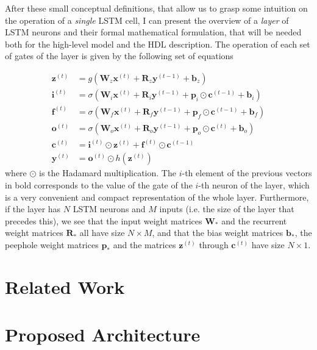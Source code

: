 \documentclass{IEEEtran}
\newcommand{\mb}[1]{\mathbf{#1}}
\begin{document}
After these small conceptual definitions, that allow us to grasp some intuition on the operation of a \textit{single} LSTM cell, I can present the overview of a \textit{layer} of LSTM neurons and their formal mathematical formulation, that will be needed both for the high-level model and the HDL description. The operation of each set of gates of the layer is given by the following set of equations

\begin{eqnarray}
    \mb{z}^{(t)} & = g(\mb{W}_z \mb{x}^{(t)} + \mb{R}_z \mb{y}^{(t-1)} + \mb{b}_z) \nonumber\\
    \mb{i}^{(t)} & = \sigma(\mb{W}_i \mb{x}^{(t)} + \mb{R}_i \mb{y}^{(t-1)} + \mb{p}_i \odot \mb{c}^{(t-1)} + \mb{b}_i) \nonumber\\
    \mb{f}^{(t)} & = \sigma(\mb{W}_f \mb{x}^{(t)} + \mb{R}_f \mb{y}^{(t-1)} + \mb{p}_f \odot \mb{c}^{(t-1)} + \mb{b}_f) \nonumber\\
    \mb{o}^{(t)} & = \sigma(\mb{W}_o \mb{x}^{(t)} + \mb{R}_o \mb{y}^{(t-1)} + \mb{p}_o \odot \mb{c}^{(t)} + \mb{b}_o) \nonumber\\
    \mb{c}^{(t)} & = \mb{i}^{(t)} \odot \mb{z}^{(t)} + \mb{f}^{(t)} \odot \mb{c}^{(t-1)} \nonumber \\
    \mb{y}^{(t)} & = \mb{o}^{(t)} \odot h(\mb{z}^{(t)}) \label{eq:equationsLSTM}
\end{eqnarray}
where $\odot$ is the Hadamard multiplication. The $i$-th element of the previous vectors in bold corresponds to the value of the gate of the $i$-th neuron of the layer, which is a very convenient and compact representation of the whole layer. Furthermore, if the layer has $N$ LSTM neurons and $M$ inputs (i.e. the size of the layer that precedes this), we see that the input weight matrices $\mb{W}_*$ and the  recurrent weight matrices $\mb{R}_*$ all have size $N \times M$, and that the bias weight matrices $\mb{b}_*$, the peephole weight matrices $\mb{p}_*$ and the matrices $\mb{z}^{(t)}$ through $\mb{c}^{(t)}$ have size $N \times 1$.

\section{Related Work}\label{sec:relwork}

\section{Proposed Architecture}\label{sec:proparch}
\end{document}
